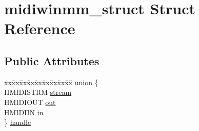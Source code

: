 \hypertarget{structmidiwinmm__struct}{}\section{midiwinmm\+\_\+struct Struct Reference}
\label{structmidiwinmm__struct}
\subsection*{Public Attributes}
\begin{DoxyCompactItemize}
\item 
\begin{tabbing}
xx\=xx\=xx\=xx\=xx\=xx\=xx\=xx\=xx\=\kill
union \{\\
\>HMIDISTRM \hyperlink{structmidiwinmm__struct_a117032659ec71d42b33f1be4c0a7889c}{stream}\\
\>HMIDIOUT \hyperlink{structmidiwinmm__struct_af3f572e57c53d6b97775e0f26cd9d0d5}{out}\\
\>HMIDIIN \hyperlink{structmidiwinmm__struct_afa31d3af271254689eb9243a3aa24ff9}{in}\\
\} \hyperlink{structmidiwinmm__struct_ac29e7bd52dc024589554d4af99a7d08e}{handle}\\


\end{tabbing}
\end{DoxyCompactItemize}

